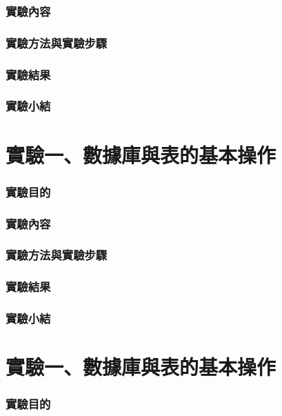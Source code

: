 \documentclass[12pt, a4paper]{report}
\begin{document}
\section{實驗內容}



\section{實驗方法與實驗步驟}

\section{實驗結果}

\section{實驗小結}

\part{實驗一、數據庫與表的基本操作}

\section{實驗目的}



\section{實驗內容}

\section{實驗方法與實驗步驟}

\section{實驗結果}

\section{實驗小結}

\part{實驗一、數據庫與表的基本操作}

\section{實驗目的}
\end{document}
